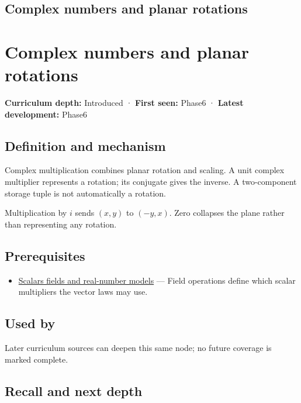 \hypertarget{appendix-f77eadcc4a93}{}
\section*{Complex numbers and planar rotations}
\chapter{Complex numbers and planar rotations}\label{appendix-f77eadcc4a93-complex-numbers-and-planar-rotations}

\textbf{Curriculum depth:} Introduced · \textbf{First seen:} Phase6 · \textbf{Latest development:} Phase6

\section{Definition and mechanism}\label{appendix-f77eadcc4a93-definition-and-mechanism}

Complex multiplication combines planar rotation and scaling. A unit complex multiplier represents a rotation; its conjugate gives the inverse. A two-component storage tuple is not automatically a rotation.

Multiplication by \(i\) sends \((x,y)\) to \((-y,x)\). Zero collapses the plane rather than representing any rotation.

\section{Prerequisites}\label{appendix-f77eadcc4a93-prerequisites}

\begin{itemize}
\tightlist
\item
  \hyperref[appendix-52051ad550fe]{Scalars fields and real-number models} --- Field operations define which scalar multipliers the vector laws may use.
\end{itemize}

\section{Used by}\label{appendix-f77eadcc4a93-used-by}

Later curriculum sources can deepen this same node; no future coverage is marked complete.

\section{Recall and next depth}\label{appendix-f77eadcc4a93-recall-and-next-depth}

